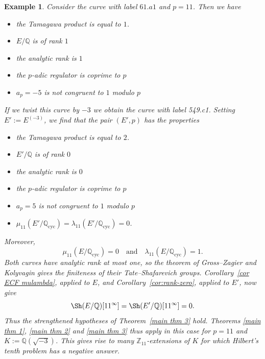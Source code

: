 \documentclass[12pt]{amsart}
\newtheorem{example}[theorem]{Example}
\newcommand{\Z}{\mathbb{Z}}
\newcommand{\Q}{\mathbb{Q}}
\newcommand{\op}[1]{\operatorname{#1}}
\numberwithin{equation}{section}
\begin{document}
\begin{example}\label{example 4.16}
Consider the curve with label $61.a1$ and $p=11$. Then we have 
\begin{itemize}
    \item the Tamagawa product is equal to $1$.
    \item $E/\Q$ is of rank $1$
    \item the analytic rank is $1$
    \item the $p$-adic regulator is coprime to $p$
    \item $a_p=-5$ is not congruent to $1$ modulo $p$
\end{itemize}
If we twist this curve by $-3$ we obtain the curve with label 549.c1. Setting $E':=E^{(-3)}$, we find that the pair $(E',p)$ has the properties
\begin{itemize}
    \item the Tamagawa product is equal to $2$.
    \item $E'/\Q$ is of rank $0$
    \item the analytic rank is $0$
    \item the $p$-adic regulator is coprime to $p$
    \item $a_p=5$ is not congruent to $1$ modulo $p$
    \item $\mu_{11}(E'/\Q_{\op{cyc}})=\lambda_{11}(E'/\Q_{\op{cyc}})=0$.
\end{itemize}
Moreover,
\[
    \mu_{11}(E/\Q_{\op{cyc}})=0
    \quad\text{and}\quad
    \lambda_{11}(E/\Q_{\op{cyc}})=1.
\]
Both curves have analytic rank at most one, so the theorem of Gross--Zagier and Kolyvagin gives the finiteness of their Tate--Shafarevich groups. Corollary~\ref{cor ECF mulambda}, applied to $E$, and Corollary~\ref{cor:rank-zero}, applied to $E'$, now give
\[
    \Sh(E/\Q)[11^\infty]=\Sh(E'/\Q)[11^\infty]=0.
\]
Thus the strengthened hypotheses of Theorem~\ref{main thm 3} hold. Theorems \ref{main thm 1}, \ref{main thm 2} and \ref{main thm 3} thus apply in this case for $p=11$ and $K:=\Q(\sqrt{-3})$. This gives rise to many $\Z_{11}$-extensions of $K$ for which Hilbert's tenth problem has a negative answer.
\end{example}
\end{document}
